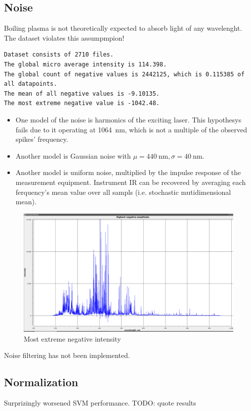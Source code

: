 \documentclass{article}
\begin{document}
\subsection{Noise}
Boiling plasma is not theoretically expected to absorb light of any wavelenght.
The dataset violates this assumpmpion!
\par
\begin{verbatim}
Dataset consists of 2710 files.
The global micro average intensity is 114.398.
The global count of negative values is 2442125, which is 0.115385 of all datapoints.
The mean of all negative values is -9.10135.
The most extreme negative value is -1042.48.
\end{verbatim}
\begin{itemize}
\item{One model of the noise is harmonics of the exciting laser.
This hypothesys fails due to it operating at \SI{1064}{\nano\metre}, which is not a multiple of the observed spikes' frequency.}
\item{Another model is Gaussian noise with $\mu=\SI{440}{\nano\metre}, \sigma=\SI{40}{\nano\metre}$.}
\item{Another model is uniform noise, multiplied by the impulse response of the measurement equipment.
Instrument IR can be recovered by averaging each ferquency's mean value over all sampls (i.e. stochastic mutidimensional mean).}
\end{itemize}
\begin{figure}
\caption{Most extreme negative intensity}
\centering
\includegraphics[width=1.25\textwidth]{img/negatives}
\end{figure}
Noise filtering has not been implemented.


\subsection{Normalization}
Surprizingly worsened SVM performance.
TODO: quote results
\end{document}
